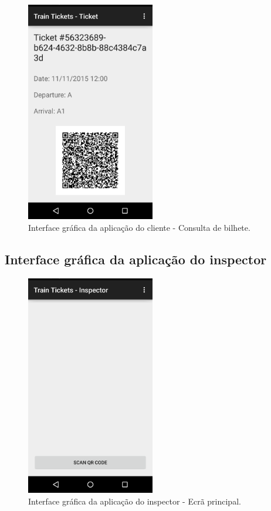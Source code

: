 \documentclass[12pt]{article}
\begin{document}
\begin{figure}[H]
	\centering
	\includegraphics[width=0.5\textwidth]{Screenshot_Ticket.png}
	\caption{Interface gráfica da aplicação do cliente - Consulta de bilhete.}
	\label{fig:c6}
\end{figure}

\subsection{Interface gráfica da aplicação do inspector}

\begin{figure}[H]
    \centering
    \includegraphics[width=0.5\textwidth]{Screenshot_Inspector_Main.png}
    \caption{Interface gráfica da aplicação do inspector - Ecrã principal.}
    \label{fig:c7}
\end{figure}
\end{document}
